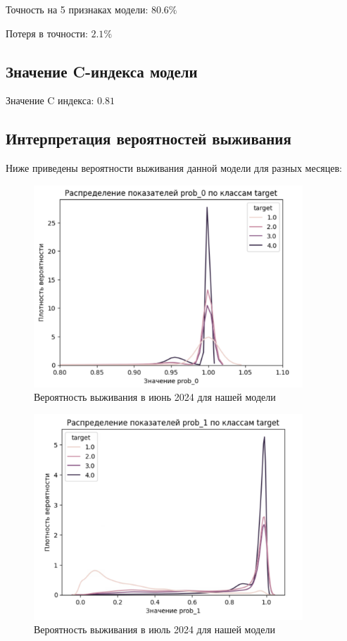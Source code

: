 \documentclass[a4paper,14pt,oneside,openany]{memoir}
\begin{document}
Точность на 5 признаках модели: $80.6\%$

Потеря в точности: $2.1\%$

\subsection{Значение C-индекса модели}

Значение C индекса: $0.81$

\subsection{Интерпретация вероятностей выживания}

Ниже приведены вероятности выживания данной модели для разных месяцев: 

\begin{figure}[H]
	\includegraphics[width=0.9\textwidth]{../figures/prob_0_our.png}
	\caption{Вероятность выживания в июнь 2024 для нашей модели}
\end{figure}

\begin{figure}[H]
	\includegraphics[width=0.9\textwidth]{../figures/prob_1_our.png}
	\caption{Вероятность выживания в июль 2024 для нашей модели}
\end{figure}
\end{document}
